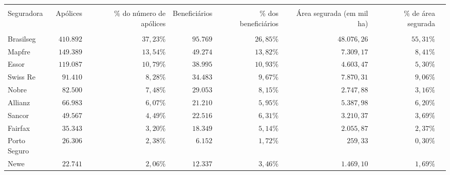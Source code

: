 \footnotesize
\vspace{0.05cm}
\begin{tabularx}{\textwidth}{lRRRRRRR}
    \hline \\[-1.9ex]	 
    Seguradora         & Apólices        & \% do número de apólices  & Beneficiários  & \% dos beneficiários  & Área segurada (em mil ha)  & \% de área segurada   \\
    \hline \\[-1.9ex]	 
    Brasilseg         &  $410.892$      &  $37,23\%$                &  $95.769$                    &  $26,85\%$            &  $48.076,26$       & $55,31\%$              \\
    Mapfre            &  $149.389$      &  $13,54\%$                &  $49.274$                    &  $13,82\%$            &  $7.309,17$        &  $8,41\%$               \\
    Essor             &  $119.087$      &  $10,79\%$                &  $38.995$                    &  $10,93\%$            &  $4.603,47$        &  $5,30\%$               \\
    Swiss Re          &  $91.410$       &  $8,28\%$                 &  $34.483$                    &  $9,67\%$             &  $7.870,31$        &  $9,06\%$               \\
    Nobre             &  $82.500$       &  $7,48\%$                 &  $29.053$                    &  $8,15\%$             &  $2.747,88$        &  $3,16\%$               \\
    Allianz           &  $66.983$       &  $6,07\%$                 &  $21.210$                    &  $5,95\%$             &  $5.387,98$        &  $6,20\%$               \\
    Sancor            &  $49.567$       &  $4,49\%$                 &  $22.516$                    &  $6,31\%$             &  $3.210,37$        &  $3,69\%$               \\
    Fairfax           &  $35.343$       &  $3,20\%$                 &  $18.349$                    &  $5,14\%$             &  $2.055,87$        &  $2,37\%$               \\
    Porto Seguro      &  $26.306$       &  $2,38\%$                 &  $6.152$                     &  $1,72\%$             &  $259,33$          &  $0,30\%$               \\
    Newe              &  $22.741$       &  $2,06\%$                 &  $12.337$                    &  $3,46\%$             &  $1.469,10$        &  $1,69\%$               \\

\end{tabularx}
